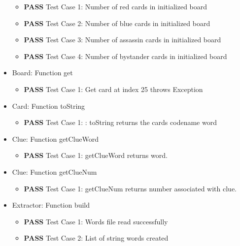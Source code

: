 \documentclass[12pt]{article}
\begin{document}
\begin{itemize}
    \begin{itemize}
        \item \textbf{PASS} Test Case 1: Number of red cards in initialized board
        \item \textbf{PASS} Test Case 2: Number of blue cards in initialized board
        \item \textbf{PASS} Test Case 3: Number of assassin cards in initialized board
        \item \textbf{PASS} Test Case 4: Number of bystander cards in initialized board
    \end{itemize}

\item Board: Function get

    \begin{itemize}
        \item \textbf{PASS} Test Case 1: Get card at index 25 throws Exception
    \end{itemize}


\item Card: Function toString
    \begin{itemize}
        \item \textbf{PASS} Test Case 1: : toString returns the cards codename word
	\end{itemize}


\item Clue: Function getClueWord

    \begin{itemize}
        \item \textbf{PASS} Test Case 1: getClueWord returns word.
    \end{itemize}

\item Clue: Function getClueNum

    \begin{itemize}
        \item \textbf{PASS} Test Case 1: getClueNum returns number associated with clue.
    \end{itemize}


\item Extractor: Function build

    \begin{itemize}
        \item \textbf{PASS} Test Case 1: Words file read successfully
        \item \textbf{PASS} Test Case 2: List of string words created
    \end{itemize}


\end{itemize}
\end{document}
